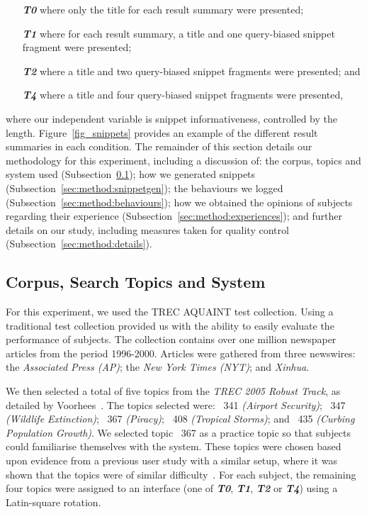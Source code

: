 \begin{itemize}
    \item[\textbf{\emph{T0}}]{where only the title for each result summary were presented;}
    \item[\textbf{\emph{T1}}]{where for each result summary, a title and one query-biased snippet fragment were presented;}
    \item[\textbf{\emph{T2}}]{where a title and two query-biased snippet fragments were presented; and}
    \item[\textbf{\emph{T4}}]{where a title and four query-biased snippet fragments were presented,}
\end{itemize}
\noindent where our independent variable is snippet informativeness, controlled by the length. Figure~\ref{fig_snippets} provides an example of the different result summaries in each condition.
The remainder of this section details our methodology for this experiment, including a discussion of: the corpus, topics and system used (Subsection~\ref{sec:method:corpus}); how we generated snippets (Subsection~\ref{sec:method:snippetgen}); the behaviours we logged (Subsection~\ref{sec:method:behaviours}); how we obtained the opinions of subjects regarding their experience (Subsection~\ref{sec:method:experiences}); and further details on our study, including measures taken for quality control (Subsection~\ref{sec:method:details}).

\subsection{Corpus, Search Topics and System}\label{sec:method:corpus}
For this experiment, we used the TREC AQUAINT test collection. Using a traditional test collection provided us with the ability to easily evaluate the performance of subjects. The collection contains over one million newspaper articles from the period 1996-2000. Articles were gathered from three newswires: the \emph{Associated Press (AP)}; the \emph{New York Times (NYT)}; and \emph{Xinhua}.

We then selected a total of five topics from the \emph{TREC 2005 Robust Track}, as detailed by Voorhees~\cite{voorhees2006trec_robust}. The topics selected were: \textnumero~341 \emph{(Airport Security)}; \textnumero~347 \emph{(Wildlife Extinction)}; \textnumero~367 \emph{(Piracy)}; \textnumero~408 \emph{(Tropical Storms)}; and \textnumero~435 \emph{(Curbing Population Growth)}. We selected topic \textnumero~367 as a practice topic so that subjects could familiarise themselves with the system. These topics were chosen based upon evidence from a previous user study with a similar setup, where it was shown that the topics were of similar difficulty~\cite{kelly2009query_suggestion}. For each subject, the remaining four topics were assigned to an interface (one of \textbf{\emph{T0}}, \textbf{\emph{T1}}, \textbf{\emph{T2}} or \textbf{\emph{T4}}) using a Latin-square rotation.

